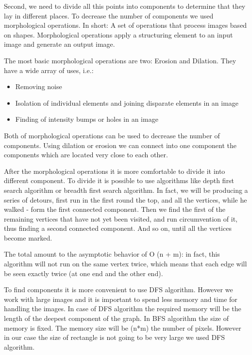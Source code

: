 Second, we need to divide all this points into components to determine that they lay in different places. To decrease the number of components we used morphological operations. In short: A set of operations that process images based on shapes. Morphological operations apply a structuring element to an input image and generate an output image.

The most basic morphological operations are two: Erosion and Dilation. They have a wide array of uses, i.e.:
\begin{itemize}
    \item Removing noise
    \item Isolation of individual elements and joining disparate elements in an image
    \item Finding of intensity bumps or holes in an image
\end{itemize}

Both of morphological operations can be used to decrease the number of components. Using dilation or erosion we can connect into one component the components which are located very close to each other.

After the morphological operations it is more comfortable to divide it into different component. To divide it is possible to use algorithms like depth first search algorithm or breadth first search algorithm. In fact, we will be producing a series of detours, first run in the first round the top, and all the vertices, while he walked - form the first connected component. Then we find the first of the remaining vertices that have not yet been visited, and run circumvention of it, thus finding a second connected component. And so on, until all the vertices become marked.

The total amount to the asymptotic behavior of O (n + m): in fact, this algorithm will not run on the same vertex twice, which means that each edge will be seen exactly twice (at one end and the other end).\cite{Thomas}

To find components it is more convenient to use DFS algorithm. However we work with large images and it is important to spend less memory and time for handling the images. In case of DFS algorithm the required memory will be the length of the deepest component of the graph. In BFS algorithm the size of memory is fixed. The memory size will be (n*m) the number of pixels. However in our case the size of rectangle is not going to be very large we used DFS algorithm.

